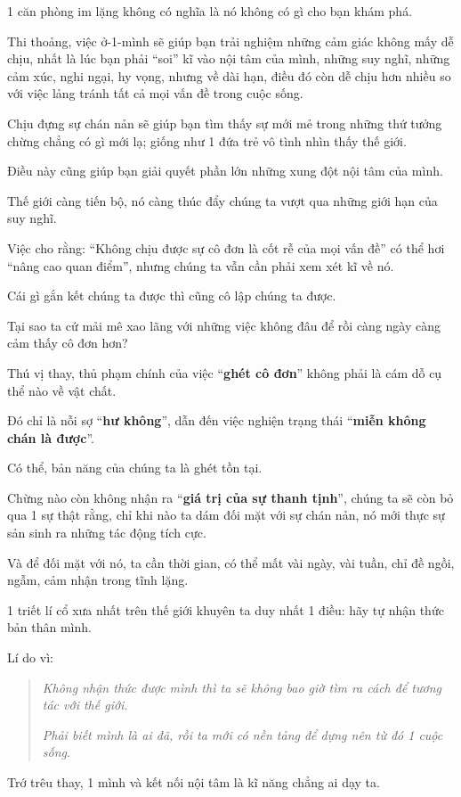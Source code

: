 \documentclass{book}
\numberwithin{equation}{section}
\begin{document}
1 căn phòng im lặng không có nghĩa là nó không có gì cho bạn khám phá.

%
Thi thoảng, việc ở-1-mình sẽ giúp bạn trải nghiệm những cảm giác không mấy dễ chịu, nhất là lúc bạn phải ``soi'' kĩ vào nội tâm của mình, những suy nghĩ, những cảm xúc, nghi ngại, hy vọng, nhưng về dài hạn, điều đó còn dễ chịu hơn nhiều so với việc lảng tránh tất cả mọi vấn đề trong cuộc sống.

%
Chịu đựng sự chán nản sẽ giúp bạn tìm thấy sự mới mẻ trong những thứ tưởng chừng chẳng có gì mới lạ; giống như 1 đứa trẻ vô tình nhìn thấy thế giới.

Điều này cũng giúp bạn giải quyết phần lớn những xung đột nội tâm của mình.

%
Thế giới càng tiến bộ, nó càng thúc đẩy chúng ta vượt qua những giới hạn của suy nghĩ.

Việc cho rằng: ``Không chịu được sự cô đơn là cốt rễ của mọi vấn đề'' có thể hơi ``nâng cao quan điểm'', nhưng chúng ta vẫn cần phải xem xét kĩ về nó.

%
Cái gì gắn kết chúng ta được thì cũng cô lập chúng ta được.

Tại sao ta cứ mải mê xao lãng với những việc không đâu để rồi càng ngày càng cảm thấy cô đơn hơn?

%
Thú vị thay, thủ phạm chính của việc ``\textbf{ghét cô đơn}'' không phải là cám dỗ cụ thể nào về vật chất.

Đó chỉ là nỗi sợ ``\textbf{hư không}'', dẫn đến việc nghiện trạng thái ``\textbf{miễn không chán là được}''.

Có thể, bản năng của chúng ta là ghét tồn tại.

%
Chừng nào còn không nhận ra ``\textbf{giá trị của sự thanh tịnh}'', chúng ta sẽ còn bỏ qua 1 sự thật rằng, chỉ khi nào ta dám đối mặt với sự chán nản, nó mới thực sự sản sinh ra những tác động tích cực.

Và để đối mặt với nó, ta cần thời gian, có thể mất vài ngày, vài tuần, chỉ đề ngồi, ngẫm, cảm nhận trong tĩnh lặng.

%
1 triết lí cổ xưa nhất trên thế giới khuyên ta duy nhất 1 điều: hãy tự nhận thức bản thân mình.

Lí do vì:

\begin{quotation}
    \textit{Không nhận thức được mình thì ta sẽ không bao giờ tìm ra cách để tương tác với thế giới}.
    
    \textit{Phải biết mình là ai đã, rồi ta mới có nền tảng để dựng nên từ đó 1 cuộc sống}.
\end{quotation}
Trớ trêu thay, 1 mình và kết nối nội tâm là kĩ năng chẳng ai dạy ta.
\end{document}
